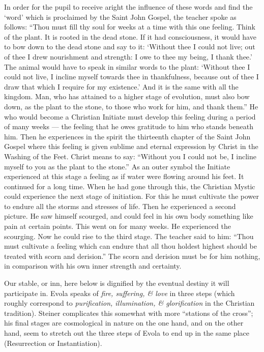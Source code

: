 \begin{quotex}
In order for the pupil to receive aright the influence of these words and find the `word' which is proclaimed by the Saint John Gospel, the teacher spoke as follows: ``Thou must fill thy soul for weeks at a time with this one feeling. Think of the plant. It is rooted in the dead stone. If it had consciousness, it would have to bow down to the dead stone and say to it: `Without thee I could not live; out of thee I drew nourishment and strength: I owe to thee my being, I thank thee.' The animal would have to speak in similar words to the plant: `Without thee I could not live, I incline myself towards thee in thankfulness, because out of thee I draw that which I require for my existence.' And it is the same with all the kingdom. Man, who has attained to a higher stage of evolution, must also bow down, as the plant to the stone, to those who work for him, and thank them.'' He who would become a Christian Initiate must develop this feeling during a period of many weeks --- the feeling that he owes gratitude to him who stands beneath him. Then he experiences in the spirit the thirteenth chapter of the Saint John Gospel where this feeling is given sublime and eternal expression by Christ in the Washing of the Feet. Christ means to say: ``Without you I could not be, I incline myself to you as the plant to the stone.'' As an outer symbol the Initiate experienced at this stage a feeling as if water were flowing around his feet. It continued for a long time. When he had gone through this, the Christian Mystic could experience the next stage of initiation. For this he must cultivate the power to endure all the storms and stresses of life. Then he experienced a second picture. He saw himself scourged, and could feel in his own body something like pain at certain points. This went on for many weeks. He experienced the scourging. Now he could rise to the third stage. The teacher said to him: ``Thou must cultivate a feeling which can endure that all thou holdest highest should be treated with scorn and derision.'' The scorn and derision must be for him nothing, in comparison with his own inner strength and certainty.
\end{quotex}


Our stable, or inn, here below is dignified by the eventual destiny it will participate in. Evola speaks of \emph{fire, suffering, \& love} in three steps (which roughly correspond to \emph{purification, illumination, \& glorification} in the Christian tradition). Steiner complicates this somewhat with more ``stations of the cross''; his final stages are cosmological in nature on the one hand, and on the other hand, seem to stretch out the three steps of Evola to end up in the same place (Resurrection or Instantiation).

